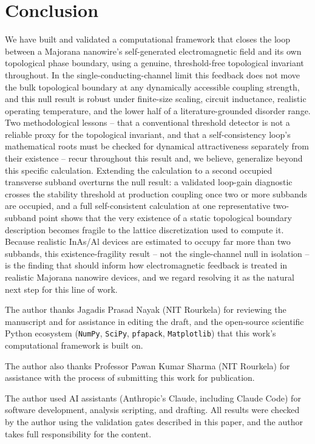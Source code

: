 \documentclass[aps,physrev,reprint,superscriptaddress,amsmath,amssymb,floatfix]{revtex4-2}
\begin{document}
\section{Conclusion}

We have built and validated a computational framework that closes the
loop between a Majorana nanowire's self-generated electromagnetic field
and its own topological phase boundary, using a genuine, threshold-free
topological invariant throughout. In the single-conducting-channel limit
this feedback does not move the bulk topological boundary at any
dynamically accessible coupling strength, and this null result is robust
under finite-size scaling, circuit inductance, realistic operating
temperature, and the lower half of a literature-grounded disorder range.
Two methodological lessons -- that a conventional threshold detector is
not a reliable proxy for the topological invariant, and that a
self-consistency loop's mathematical roots must be checked for dynamical
attractiveness separately from their existence -- recur throughout this
result and, we believe, generalize beyond this specific calculation.
Extending the calculation to a second occupied transverse subband
overturns the null result: a validated loop-gain diagnostic crosses the
stability threshold at production coupling once two or more subbands are
occupied, and a full self-consistent calculation at one representative
two-subband point shows that the very existence of a static topological
boundary description becomes fragile to the lattice discretization used
to compute it. Because realistic InAs/Al devices are estimated to occupy
far more than two subbands, this existence-fragility result -- not the
single-channel null in isolation -- is the finding that should inform how
electromagnetic feedback is treated in realistic Majorana nanowire
devices, and we regard resolving it as the natural next step for this
line of work.

\begin{acknowledgments}
The author thanks Jagadis Prasad Nayak (NIT Rourkela) for reviewing the
manuscript and for assistance in editing the draft, and the open-source
scientific Python ecosystem (\texttt{NumPy}, \texttt{SciPy},
\texttt{pfapack}, \texttt{Matplotlib}) that this work's computational
framework is built on.

The author also thanks Professor Pawan Kumar Sharma (NIT Rourkela) for
assistance with the process of submitting this work for publication.

The author used AI assistants (Anthropic's Claude, including Claude
Code) for software development, analysis scripting, and drafting. All
results were checked by the author using the validation gates described
in this paper, and the author takes full responsibility for the content.
\end{acknowledgments}
\end{document}

